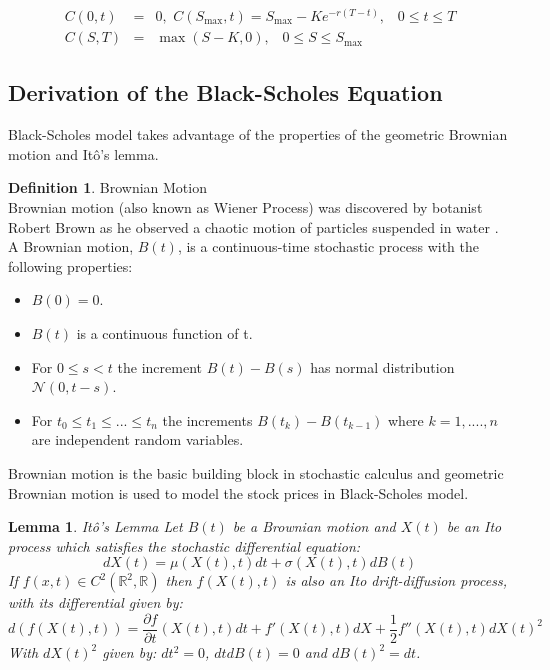 \documentclass[12pt, oneside]{book}
\theoremstyle{plain}
\newtheorem{lemma}[theorem]{Lemma}
\theoremstyle{definition}
\newtheorem{definition}[theorem]{Definition}
\begin{document}
\begin{eqnarray}
C(0,t) &=& 0, \hspace{4pt} C(S_{\max},t)=S_{\max} - K e^{-r(T-t)}, \hspace{10pt} 0 \leq t \leq T \\[10pt]
C(S,T) &=& \max(S-K,0), \hspace{10pt} 0 \leq S \leq S_{\max}
\end{eqnarray}

\subsection{Derivation of the Black-Scholes Equation}
Black-Scholes model takes advantage of the properties of the geometric Brownian motion and It\^{o}'s lemma. 

\begin{definition} Brownian Motion \\
Brownian motion (also known as Wiener Process) was discovered by botanist Robert Brown as he observed a chaotic motion of particles suspended in water \cite{BM}. A  Brownian  motion, $B(t)$,  is  a  continuous-time  stochastic  process  with  the  following properties: 
\begin{itemize}
\item $ B(0) = 0 $.
\item $ B(t) $ is a continuous function of t.
\item For $ 0  \leq s < t $ the increment $ B(t) -  B(s)  $ has normal distribution  $ \mathcal{N}(0, t-s) $.
\item  For $ t_0  \leq  t_1 \leq ... \leq  t_n $ the increments $ B(t_k) - B(t_{k-1}) $ where $k=1, .... ,n $ are independent random variables.
\end{itemize}    
Brownian motion is the basic building block in stochastic calculus and geometric Brownian motion is used to model the stock prices in Black-Scholes model.
\end{definition}

\begin{lemma} It\^{o}'s Lemma
Let $B(t)$ be a Brownian motion and $X(t)$ be an Ito process which satisfies the stochastic differential equation:
\begin{equation}
dX(t) = \mu(X(t),t)dt + \sigma(X(t),t)dB(t)
\end{equation} 
If $f(x, t) \in C^2(\mathbb{R}^2,\mathbb{R})$ then $f(X(t),t)$ is also an Ito drift-diffusion process, with its differential given by:
\begin{equation}
d(f(X(t),t)) = \frac{\partial f}{\partial t}(X(t),t)dt + f'(X(t),t)dX + \frac{1}{2}f''(X(t),t)dX(t)^2
\end{equation} 
With $dX(t)^2$ given by: $dt^2 = 0$, $dt dB(t) = 0$ and $dB(t)^2 = dt$.
\end{lemma}
\end{document}
